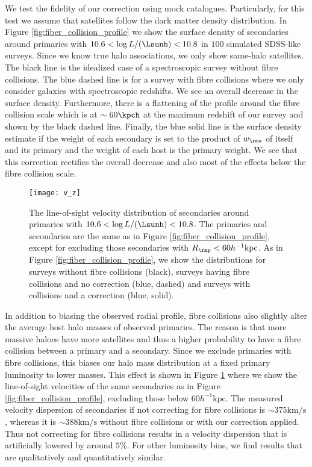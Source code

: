 \documentclass[fleqn,usenatbib,useAMS]{mnras}
\begin{document}
	We test the fidelity of our correction using mock catalogues. Particularly, for this test we assume that satellites follow the dark matter density distribution. In Figure \ref{fig:fiber_collision_profile} we show the surface density of secondaries around primaries with $10.6 < \log L / (\Lsunh) < 10.8$ in $100$ simulated SDSS-like surveys. Since we know true halo associations, we only show same-halo satellites. The black line is the idealized case of a spectroscopic survey without fibre collisions. The blue dashed line is for a survey with fibre collisions where we only consider galaxies with spectroscopic redshifts. We see an overall decrease in the surface density. Furthermore, there is a flattening of the profile around the fibre collision scale which is at $\sim 60\kpch$ at the maximum redshift of our survey and shown by the black dashed line. Finally, the blue solid line is the surface density estimate if the weight of each secondary is set to the product of $w_\rms$ of itself and its primary and the weight of each host is the primary weight. We see that this correction rectifies the overall decrease and also most of the effects below the fibre collision scale.
	\begin{figure}
		\centering
		\texttt{[image: v\_z]}
		\caption{The line-of-sight velocity distribution of secondaries around primaries with $10.6 < \log L / (\Lsunh) < 10.8$. The primaries and secondaries are the same as in Figure \ref{fig:fiber_collision_profile}, except for excluding those secondaries with $R_\rmp < 60 h^{-1} \mathrm{kpc}$. As in Figure \ref{fig:fiber_collision_profile}, we show the distributions for surveys without fibre collisions (black), surveys having fibre collisions and no correction (blue, dashed) and surveys with collisions and a correction (blue, solid).}
		\label{fig:fiber_collision_vz}
	\end{figure}
	
	In addition to biasing the observed radial profile, fibre collisions also slightly alter the average host halo masses of observed primaries. The reason is that more massive haloes have more satellites and thus a higher probability to have a fibre collision between a primary and a secondary. Since we exclude primaries with fibre collisions, this biases our halo mass distribution at a fixed primary luminosity to lower masses. This effect is shown in Figure \ref{fig:fiber_collision_vz} where we show the line-of-sight velocities of the same secondaries as in Figure \ref{fig:fiber_collision_profile}, excluding those below $60 h^{-1} \mathrm{kpc}$. The measured velocity dispersion of secondaries if not correcting for fibre collisions is $\sim 375 \mathrm{km/s}$, whereas it is $\sim 388 \mathrm{km/s}$ without fibre collisions or with our correction applied. Thus not correcting for fibre collisions results in a velocity dispersion that is artificially lowered by around $5 \%$. For other luminosity bins, we find results that are qualitatively and quantitatively similar.
	
\end{document}
